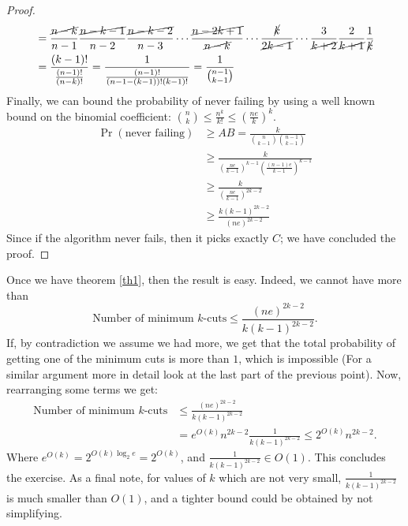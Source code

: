 \documentclass[11pt]{article}
\begin{document}
\begin{enumerate}
\begin{proof}
\begin{align*}
            &= \frac{\cancel{n-k}}{n-1}\frac{\cancel{n-k-1}}{n-2}\frac{\cancel{n-k-2}}{n-3}\cdots\frac{\cancel{n-2k+1}}{\cancel{n-k}}\cdots \frac{\cancel{k}}{\cancel{2k-1}}\cdots\frac{3}{\cancel{k+2}}\frac{2}{\cancel{k+1}}\frac{1}{\cancel{k}}\\
            &=\frac{(k-1)!}{\frac{(n-1)!}{(n-k)!}} = \frac{1}{\frac{(n-1)!}{(n-1-(k-1))!(k-1)!}} = \frac{1}{\binom{n-1}{k-1}}
        \end{align*}
        Finally, we can bound the probability of never failing by using a well known bound on the binomial coefficient: $\binom{n}{k}\leq \frac{n^k}{k!} \leq \left(\frac{ne}{k}\right)^k$.
        \begin{align*}
            \Pr\left(\text{never failing}\right) &\geq AB = \frac{k}{\binom{n}{k-1}\binom{n-1}{k-1}}\\
            & \geq \frac{k}{\left(\frac{ne}{k-1}\right)^{k-1}\left(\frac{(n-1)e}{k-1}\right)^{k-1}}\\
            & \geq \frac{k}{\left(\frac{ne}{k-1}\right)^{2k-2}}\\
            & \geq \frac{k(k-1)^{2k-2}}{(ne)^{2k-2}}
        \end{align*}
        Since if the algorithm never fails, then it picks exactly $C$; we have concluded the proof. 
    \end{proof}
    Once we have theorem \ref{th1}, then the result is easy. Indeed, we cannot have more than
    \begin{equation*}
        \text{Number of minimum $k$-cuts} \leq \frac{(ne)^{2k-2}}{k(k-1)^{2k-2}}.
    \end{equation*}
    If, by contradiction we assume we had more, we get that the total probability of getting one of the minimum cuts is more than $1$, which is impossible (For a similar argument more in detail look at the last part of the previous point). Now, rearranging some terms we get:
    \begin{align*}
        \text{Number of minimum $k$-cuts} &\leq \frac{(ne)^{2k-2}}{k(k-1)^{2k-2}}\\
        & = e^{O(k)}n^{2k-2}\frac{1}{k(k-1)^{2k-2}} \leq 2^{O(k)}n^{2k-2}.
    \end{align*}
    Where $e^{O(k)} = 2^{O(k)\log_2e} = 2^{O(k)}$, and $\frac{1}{k(k-1)^{2k-2}} \in O(1)$. This concludes the exercise. As a final note, for values of $k$ which are not very small, $\frac{1}{k(k-1)^{2k-2}}$ is much smaller than $O(1)$, and a tighter bound could be obtained by not simplifying. 
\end{enumerate}
\end{document}
